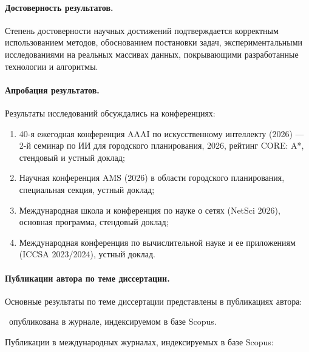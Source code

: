 \paragraph*{Достоверность результатов.}
Степень достоверности научных достижений
подтверждается корректным использованием методов, обоснованием постановки задач, экспериментальными исследованиями на реальных массивах данных, покрывающими разработанные технологии и алгоритмы.

\paragraph*{Апробация результатов.}
Результаты исследований обсуждались на конференциях:​

\begin{enumerate}
	\item 40-я ежегодная конференция AAAI по искусственному интеллекту (2026) --- 2-й семинар по ИИ для городского планирования, 2026, рейтинг CORE: A*, стендовый и устный доклад;
	\item Научная конференция AMS (2026) в области городского планирования, специальная секция, устный доклад;
	\item Международная школа и конференция по науке о сетях (NetSci 2026), основная программа, стендовый доклад;
	\item Международная конференция по вычислительной науке и ее приложениям (ICCSA 2023/2024), устный доклад.
\end{enumerate}

\paragraph*{Публикации автора по теме диссертации.}
Основные результаты по теме диссертации представлены в публикациях автора:


\theScopusPapers~опубликована в журнале, индексируемом в базе Scopus.



Публикации в международных журналах, индексируемых в базе Scopus:
\begin{refsection}
\nocite{*}
\printbibliography[
    keyword=scopus,
    heading=none,
    resetnumbers=true
]
\end{refsection}



